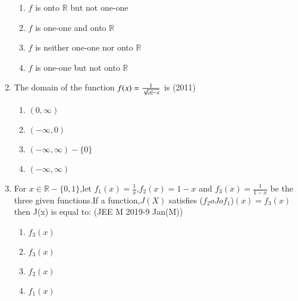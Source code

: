 \documentclass[journal,12pt,twocolumn]{IEEEtran}
\theoremstyle{remark}
\begin{document}
\begin{enumerate}[start=4]
	     \begin{enumerate}
		     \item $f$ is onto $\mathbb{R}$ but not one-one
		     \item $f$ is one-one and onto $\mathbb{R}$
		     \item $f$ is neither one-one nor onto $\mathbb{R}$
		     \item $f$ is one-one but not onto $\mathbb{R}$
	     \end{enumerate}
     \item The domain of the function $f(x)=\frac{1}{\sqrt{\left\vert x\right\vert-x}}$ is \hfill(2011)\\
	     \begin{enumerate}
		     \item $(0,\infty)$
		     \item $(-\infty,0)$
		     \item $(-\infty,\infty)-\{0\} $
		     \item $(-\infty,\infty)$
	     \end{enumerate}

     \item For $x\in \mathbb{R}-\{0,1\}$,let $f_1(x)=\frac{1}{x}$,$f_2(x)=1-x$ and $f_3(x)=\frac{1}{1-x}$ be the three given functions.If a function,$J(X)$ satisfies ($f_2oJof_1$)$(x)=f_3(x)$ then J(x) is equal to: \hfill(JEE M 2019-9 Jan(M))
	     \begin{enumerate}
		     \item $f_3(x)$
		     \item $f_3(x)$
		     \item $f_2(x)$
		     \item $f_1(x)$
	     \end{enumerate}
	
\end{enumerate}
\end{document}

